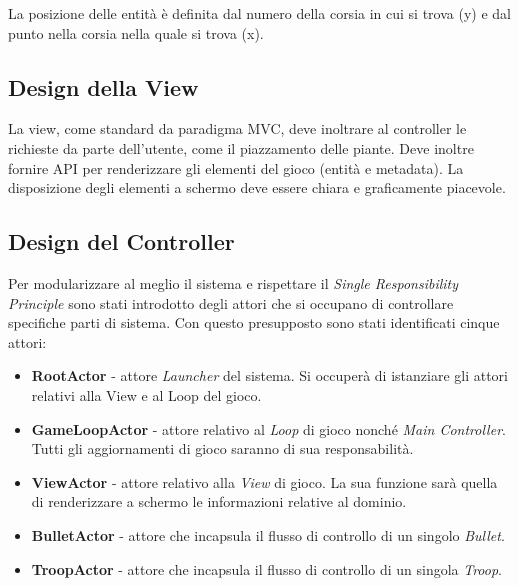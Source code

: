 La posizione delle entità è definita dal numero della corsia in cui si trova (y) e dal punto nella corsia nella quale si trova (x).

\subsection{Design della View}
La view, come standard da paradigma MVC, deve inoltrare al controller le richieste da parte dell'utente,
come il piazzamento delle piante.
Deve inoltre fornire API per renderizzare gli elementi del gioco (entità e metadata).
La disposizione degli elementi a schermo deve essere chiara e graficamente piacevole.

\subsection{Design del Controller}
Per modularizzare al meglio il sistema e rispettare il \textit{Single Responsibility Principle}
sono stati introdotto degli attori che si occupano di controllare specifiche parti di sistema. Con questo presupposto sono
stati identificati cinque attori:
\begin{itemize}
    \item \textbf{RootActor} - attore \textit{Launcher} del sistema. Si occuperà di
    istanziare gli attori relativi alla View e al Loop del gioco.
    \item \textbf{GameLoopActor} - attore relativo al \textit{Loop} di gioco nonché
    \textit{Main Controller}. Tutti gli aggiornamenti di gioco saranno di sua responsabilità.
    \item \textbf{ViewActor} - attore relativo alla \textit{View} di gioco.
    La sua funzione sarà quella di renderizzare a schermo le informazioni relative al dominio.
    \item \textbf{BulletActor} - attore che incapsula il flusso di controllo di un singolo \textit{Bullet}.
    \item \textbf{TroopActor} - attore che incapsula il flusso di controllo di un singola \textit{Troop}.
\end{itemize}



